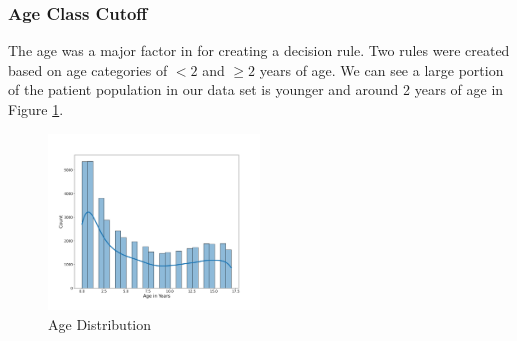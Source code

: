 \documentclass[11pt, letterpaper]{amsart}
\let\Oldsubsubsection\subsubsection
\renewcommand{\subsubsection}{\FloatBarrier\Oldsubsubsection}
\begin{document}
\subsubsection{Age Class Cutoff}

The age was a major factor in \cite{kuppermann2009identification} for creating a decision rule. Two rules were created based on age categories of $< 2$ and $\geq 2$ years of age. We can see a large portion of the patient population in our data set is younger and around 2 years of age in Figure \ref{fig:age_dist}.
\begin{figure}
	\centering
	\includegraphics[width=0.5\textwidth]{age_dist.png}
	\caption{Age Distribution}\label{fig:age_dist}
\end{figure}
\end{document}
